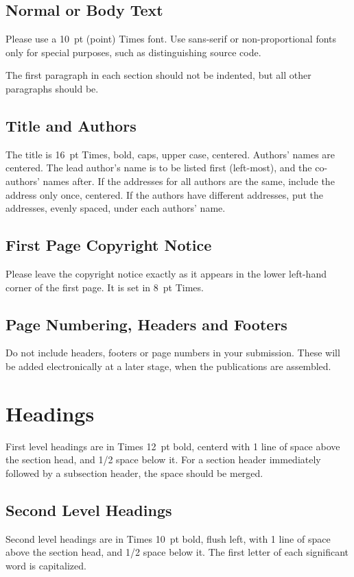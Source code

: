 \documentclass{article}
\begin{document}
\subsection{Normal or Body Text}
\label{subsec:body}
Please use a 10~pt (point) Times font. Use sans-serif or non-proportional fonts only for special purposes, such as distinguishing source code.

The first paragraph in each section should not be indented, 
but all other paragraphs should be.

\subsection{Title and Authors}
The title is 16~pt Times, bold, caps, upper case, centered. Authors' names are centered. The lead author's name is to be listed first (left-most), and the co-authors' names after. If the addresses for all authors are the same, include the address only once, centered. If the authors have different addresses, put the addresses, evenly spaced, under each authors' name.

\subsection{First Page Copyright Notice}
Please leave the copyright notice exactly as it appears in the lower left-hand corner of the first page. It is set in 8~pt Times.

\subsection{Page Numbering, Headers and Footers}
Do not include headers, footers or page numbers in your submission. These will be added electronically at a later stage, when the publications are assembled.

\section{Headings}
First level headings are in Times 12~pt bold, centerd with 1 line of space above the section head, and 1/2 space below it.
For a section header immediately followed by a subsection header, the space should be merged.

\subsection{Second Level Headings}
Second level headings are in Times 10~pt bold, flush left, with 1 line of space above the section head, and 1/2 space below it. The first letter of each significant word is capitalized.
\end{document}
